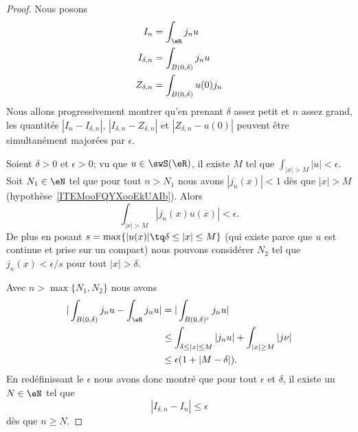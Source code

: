 \begin{proof}
    Nous posons
    \begin{subequations}
        \begin{align}
            I_n&=\int_{\eR}j_nu\\
            I_{\delta,n}&=\int_{B(0,\delta)}j_nu\\
            Z_{\delta,n}&=\int_{B(0,\delta)}u(0)j_n
        \end{align}
    \end{subequations}
    Nous allons progressivement montrer qu'en prenant \( \delta\) assez petit et \( n\) assez grand, les quantités \( | I_n-I_{\delta,n} |\), \( | I_{\delta,n}-Z_{\delta,n}  |\) et \( | Z_{\delta,n}-u(0) |\) peuvent être simultanément majorées par \( \epsilon\).

    Soient \( \delta>0\) et \( \epsilon>0\); vu que \( u\in\swS(\eR)\), il existe \( M\) tel que \( \int_{| x |>M}| u |<\epsilon\). Soit \( N_1\in \eN\) tel que pour tout \( n>N_1\) nous avons \( | j_n(x) |<1\) dès que \( | x |>M\) (hypothèse~\ref{ITEMooFQYXooEkUAIb}). Alors
    \begin{equation}
        \int_{| x |>M}| j_n(x)u(x) |<\epsilon.
    \end{equation}
    De plus en posant \( s=\max\{ | u(x) |\tq \delta\leq | x |\leq M \}\) (qui existe parce que \( u\) est continue et prise sur un compact) nous pouvons considérer \( N_2\) tel que \( j_n(x)<\epsilon/s\) pour tout \( | x |>\delta\).

    Avec \( n>\max\{ N_1,N_2 \}\) nous avons
    \begin{subequations}
        \begin{align}
            | \int_{B(0,\delta)}j_nu-\int_{\eR}j_nu |&=| \int_{B(0,\delta)^c}j_nu |\\
            &\leq \int_{\delta\leq| x |\leq M}| j_nu |+\int_{| x |\geq M}| j\nu |\\
            &\leq \epsilon(1+| M-\delta |).
        \end{align}
    \end{subequations}
    En redéfinissant le \( \epsilon\) nous avons donc montré que pour tout \( \epsilon\) et \( \delta\), il existe un \( N\in \eN\) tel que
    \begin{equation}
        | I_{\delta,n}-I_n |\leq \epsilon
    \end{equation}
    dès que \( n\geq N\).


\end{proof}
